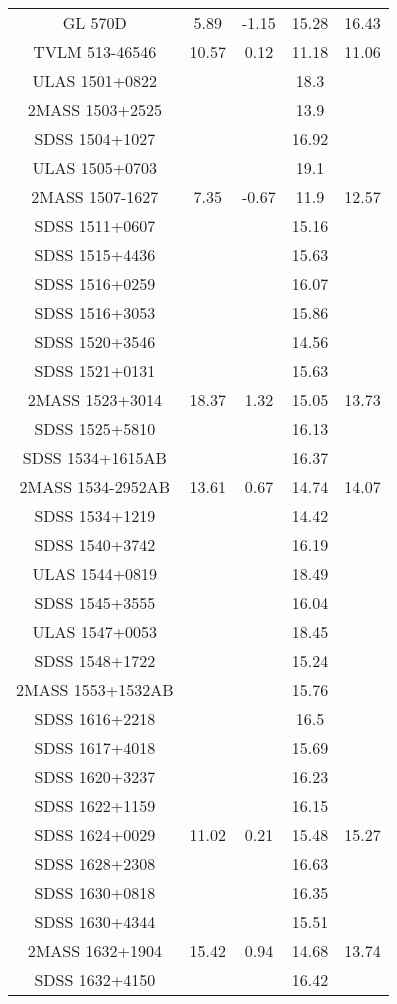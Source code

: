 \begin{table}
\begin{tabular}{ccccc}
GL 570D & 5.89 & -1.15 & 15.28 & 16.43 \\
TVLM 513-46546 & 10.57 & 0.12 & 11.18 & 11.06 \\
ULAS 1501+0822 &  &  & 18.3 &  \\
2MASS 1503+2525 &  &  & 13.9 &  \\
SDSS 1504+1027 &  &  & 16.92 &  \\
ULAS 1505+0703 &  &  & 19.1 &  \\
2MASS 1507-1627 & 7.35 & -0.67 & 11.9 & 12.57 \\
SDSS 1511+0607 &  &  & 15.16 &  \\
SDSS 1515+4436 &  &  & 15.63 &  \\
SDSS 1516+0259 &  &  & 16.07 &  \\
SDSS 1516+3053 &  &  & 15.86 &  \\
SDSS 1520+3546 &  &  & 14.56 &  \\
SDSS 1521+0131 &  &  & 15.63 &  \\
2MASS 1523+3014 & 18.37 & 1.32 & 15.05 & 13.73 \\
SDSS 1525+5810 &  &  & 16.13 &  \\
SDSS 1534+1615AB &  &  & 16.37 &  \\
2MASS 1534-2952AB & 13.61 & 0.67 & 14.74 & 14.07 \\
SDSS 1534+1219 &  &  & 14.42 &  \\
SDSS 1540+3742 &  &  & 16.19 &  \\
ULAS 1544+0819 &  &  & 18.49 &  \\
SDSS 1545+3555 &  &  & 16.04 &  \\
ULAS 1547+0053 &  &  & 18.45 &  \\
SDSS 1548+1722 &  &  & 15.24 &  \\
2MASS 1553+1532AB &  &  & 15.76 &  \\
SDSS 1616+2218 &  &  & 16.5 &  \\
SDSS 1617+4018 &  &  & 15.69 &  \\
SDSS 1620+3237 &  &  & 16.23 &  \\
SDSS 1622+1159 &  &  & 16.15 &  \\
SDSS 1624+0029 & 11.02 & 0.21 & 15.48 & 15.27 \\
SDSS 1628+2308 &  &  & 16.63 &  \\
SDSS 1630+0818 &  &  & 16.35 &  \\
SDSS 1630+4344 &  &  & 15.51 &  \\
2MASS 1632+1904 & 15.42 & 0.94 & 14.68 & 13.74 \\
SDSS 1632+4150 &  &  & 16.42 &  \\

\end{tabular}
\end{table}
